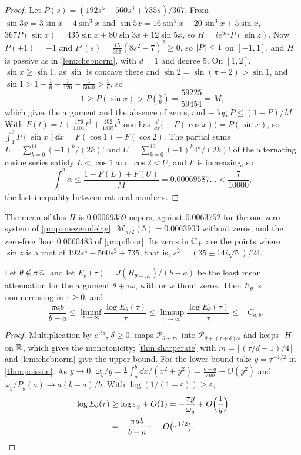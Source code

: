 \begin{proof}
Let $P(s)=(192s^5-560s^3+735s)/367$. From $\sin3x=3\sin x-4\sin^3x$ and
$\sin5x=16\sin^5x-20\sin^3x+5\sin x$,
$367P(\sin x)=435\sin x+80\sin3x+12\sin5x$, so $H=ie^{5iz}P(\sin z)$. Now
$P(\pm1)=\pm1$ and $P'(s)=\frac{15}{367}(8s^2-7)^2\ge0$, so $\left|P\right|\le1$ on
$[-1,1]$, and $H$ is passive as in \cref{lem:chebnorm}, with $d=1$ and degree
$5$. On $[1,2]$, $\sin x\ge\sin1$, as $\sin$ is concave there and
$\sin2=\sin(\pi-2)>\sin1$, and $\sin1>1-\frac16+\frac1{120}-\frac1{5040}>\frac56$, so
\[
1\ge P(\sin x)>P(\tfrac56)=\frac{59225}{59454}=M,
\]
which gives the argument and the absence of zeros, and $-\log P\le(1-P)/M$.
With $F(t)=t+\frac{176}{1101}t^3+\frac{192}{1835}t^5$ one has
$\frac{\dd}{\dd x}\big(-F(\cos x)\big)=P(\sin x)$, so
$\int_1^2P(\sin x)\dd x=F(\cos1)-F(\cos2)$. The partial sums
$L=\sum_{k=0}^{11}(-1)^k/(2k)!$ and $U=\sum_{k=0}^{12}(-1)^k4^k/(2k)!$ of the
alternating cosine series satisfy $L<\cos1$ and $\cos2<U$, and $F$ is
increasing, so
\[
\int_1^2\alpha\le\frac{1-F(L)+F(U)}M=0.00069587\ldots<\frac7{10000},
\]
the last inequality between rational numbers.
\end{proof}

The mean of this $H$ is $0.00069359$ nepers, against $0.0063752$ for the
one-zero system of \cref{prop:onezerodelay}, $\mathcal M_{\pi/2}(5)=0.0063903$
without zeros, and the zero-free floor $0.0060483$ of \cref{prop:floor}. Its
zeros in $\mathbb C_{+}$ are the points where $\sin z$ is a root of
$192s^4-560s^2+735$, that is, $s^2=(35\pm14i\sqrt5)/24$.

\begin{corollary}\label{cor:rate}
Let $\theta\notin\pi\mathbb Z$, and let $E_\theta(\tau)=J(H_{\theta+\tau\omega})/(b-a)$
be the least mean attenuation for the argument $\theta+\tau\omega$, with or
without zeros. Then $E_\theta$ is nonincreasing in $\tau\ge0$, and
\[
-\frac{\pi ab}{b-a}\le\liminf_{\tau\to\infty}\frac{\log E_\theta(\tau)}\tau
\le\limsup_{\tau\to\infty}\frac{\log E_\theta(\tau)}\tau\le-C_{a,b} .
\]
\end{corollary}

\begin{proof}
Multiplication by $e^{i\delta z}$, $\delta\ge0$, maps
$\mathcal P_{\theta+\tau\omega}$ into $\mathcal P_{\theta+(\tau+\delta)\omega}$ and keeps
$\left|H\right|$ on $\mathbb R$, which gives the monotonicity; \cref{thm:sharperate} with
$m=\lfloor(\tau/d-1)/4\rfloor$ and \cref{lem:chebnorm} give the upper bound. For the lower bound take
$y=\tau^{-1/2}$ in \cref{thm:poisson}. As $y\to0$,
$\omega_y/y=\frac1\pi\int_a^b\dd x/(x^2+y^2)=\frac{b-a}{\pi ab}+O(y^2)$ and
$\omega_y/P_y(a)\to a(b-a)/b$. With $\log(1/(1-\varepsilon))\ge\varepsilon$,
\begin{align*}
\log E_\theta(\tau)&\ge\log\varepsilon_y+O(1)
=-\frac{\tau y}{\omega_y}+O\Big(\frac1y\Big)\\
&=-\frac{\pi ab}{b-a}\,\tau+O\big(\tau^{1/2}\big).\qedhere
\end{align*}
\end{proof}

